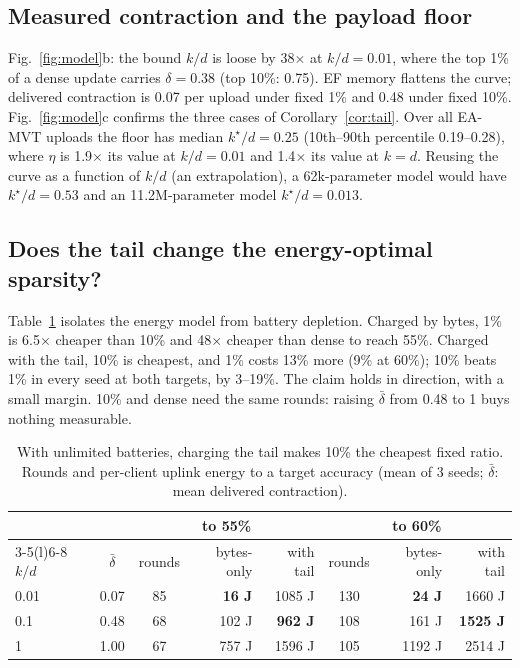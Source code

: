 \documentclass[conference,a4paper]{IEEEtran}
\newcommand{\kst}{k^\star}
\begin{document}
\subsection{Measured contraction and the payload floor}
Fig.~\ref{fig:model}b: the bound $k/d$ is loose by 38$\times$ at $k/d=0.01$, where the top 1\% of a dense update carries $\delta=0.38$ (top 10\%: 0.75). EF memory flattens the curve; delivered contraction is 0.07 per upload under fixed 1\% and 0.48 under fixed 10\%. Fig.~\ref{fig:model}c confirms the three cases of Corollary~\ref{cor:tail}. Over all EA-MVT uploads the floor has median $\kst/d=0.25$ (10th--90th percentile 0.19--0.28), where $\eta$ is 1.9$\times$ its value at $k/d=0.01$ and 1.4$\times$ its value at $k=d$. Reusing the curve as a function of $k/d$ (an extrapolation), a 62k-parameter model would have $\kst/d=0.53$ and an 11.2M-parameter model $\kst/d=0.013$.

\subsection{Does the tail change the energy-optimal sparsity?}
Table~\ref{tab:eta} isolates the energy model from battery depletion. Charged by bytes, 1\% is 6.5$\times$ cheaper than 10\% and 48$\times$ cheaper than dense to reach 55\%. Charged with the tail, 10\% is cheapest, and 1\% costs 13\% more (9\% at 60\%); 10\% beats 1\% in every seed at both targets, by 3--19\%. The claim holds in direction, with a small margin. 10\% and dense need the same rounds: raising $\bar\delta$ from 0.48 to 1 buys nothing measurable.

\begin{table}[t]
\caption{With unlimited batteries, charging the tail makes 10\% the cheapest fixed ratio. Rounds and per-client uplink energy to a target accuracy (mean of 3 seeds; $\bar\delta$: mean delivered contraction).}
\label{tab:eta}
\centering
\setlength{\tabcolsep}{3.5pt}
\begin{tabular}{@{}lccrrcrr@{}}
\toprule
 & & \multicolumn{3}{c}{to 55\%} & \multicolumn{3}{c}{to 60\%}\\
\cmidrule(lr){3-5}\cmidrule(l){6-8}
$k/d$ & $\bar\delta$ & rounds & bytes-only & with tail & rounds & bytes-only & with tail\\
\midrule
0.01 & 0.07 & 85 & \textbf{16 J} & 1085 J & 130 & \textbf{24 J} & 1660 J\\
0.1 & 0.48 & 68 & 102 J & \textbf{962 J} & 108 & 161 J & \textbf{1525 J}\\
1 & 1.00 & 67 & 757 J & 1596 J & 105 & 1192 J & 2514 J\\
\bottomrule
\end{tabular}
\end{table}
\end{document}
